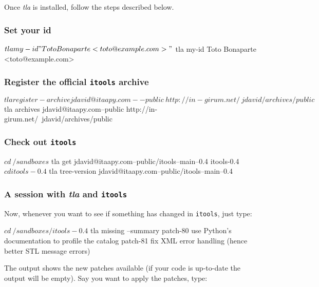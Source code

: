 Once {\em tla} is installed, follow the steps described below.


\subsubsection{Set your id}

\begin{code}
    $ tla my-id "Toto Bonaparte <toto@example.com>"
    $ tla my-id
    Toto Bonaparte <toto@example.com>
\end{code}


\subsubsection{Register the official {\tt itools} archive}

\begin{code}
    $ tla register-archive jdavid@itaapy.com--public \
          http://in-girum.net/~jdavid/archives/public
    $ tla archives
    jdavid@itaapy.com--public
        http://in-girum.net/~jdavid/archives/public
\end{code}


\subsubsection{Check out {\tt itools}}

\begin{code}
    $ cd ~/sandboxes
    $ tla get jdavid@itaapy.com--public/itools--main--0.4 itools-0.4
    $ cd itools-0.4
    $ tla tree-version
    jdavid@itaapy.com--public/itools--main--0.4
\end{code}

\subsubsection{A session with {\em tla} and {\tt itools}}

Now, whenever you want to see if something has changed in {\tt itools},
just type:

\begin{code}
    $ cd ~/sandboxes/itools-0.4
    $ tla missing --summary
    patch-80
        use Python's documentation to profile the catalog
    patch-81
        fix XML error handling (hence better STL message errors)
\end{code}

The output shows the new patches available (if your code is up-to-date
the output will be empty). Say you want to apply the patches, type:

